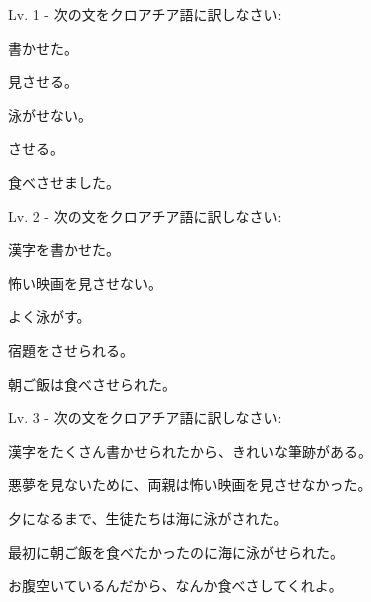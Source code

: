 	\begin{reibun}
	\end{reibun}

	\newpage		
		
	\begin{mondai}{Lv. 1 - 次の文をクロアチア語に訳しなさい: }
		\item 書かせた。
		\item 見させる。
		\item 泳がせない。
		\item させる。
		\item 食べさせました。
	\end{mondai}
		
	\begin{mondai}{Lv. 2 - 次の文をクロアチア語に訳しなさい: }
		\item 漢字を書かせた。
		\item 怖い映画を見させない。
		\item よく泳がす。
		\item 宿題をさせられる。
		\item 朝ご飯は食べさせられた。
	\end{mondai}
	
	\begin{mondai}{Lv. 3 - 次の文をクロアチア語に訳しなさい: }
		\item 漢字をたくさん書かせられたから、きれいな筆跡がある。
		\item 悪夢を見ないために、両親は怖い映画を見させなかった。
		\item 夕になるまで、生徒たちは海に泳がされた。
		\item 最初に朝ご飯を食べたかったのに海に泳がせられた。
		\item お腹空いているんだから、なんか食べさしてくれよ。\footnotemark[1]
	\end{mondai}

